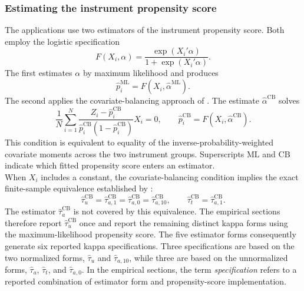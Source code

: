 \documentclass[12pt, a4paper, oneside]{article}
\theoremstyle{plain}
\theoremstyle{definition}
\begin{document}
\subsubsection{Estimating the instrument propensity score}

The applications use two estimators of the instrument propensity score. Both
employ the logistic specification
\[
    F(X_i,\alpha)
    =
    \frac{\exp(X_i'\alpha)}
         {1+\exp(X_i'\alpha)}.
\]
The first estimates $\alpha$ by maximum likelihood and produces
\[
    \hat p_i^{\mathrm{ML}}
    =
    F(X_i,\hat\alpha^{\mathrm{ML}}).
\]
The second applies the covariate-balancing approach of
\citet{imai2014covariate}. The estimate $\hat\alpha^{\mathrm{CB}}$ solves
\begin{equation}
    \frac{1}{N}\sum_{i=1}^N
    \frac{Z_i-\hat p_i^{\mathrm{CB}}}
         {\hat p_i^{\mathrm{CB}}(1-\hat p_i^{\mathrm{CB}})}
    X_i
    =0,
    \qquad
    \hat p_i^{\mathrm{CB}}
    =
    F(X_i,\hat\alpha^{\mathrm{CB}}).
    \label{eq:cbps_moment}
\end{equation}
This condition is equivalent to equality of the inverse-probability-weighted
covariate moments across the two instrument groups. Superscripts
$\mathrm{ML}$ and $\mathrm{CB}$ indicate which fitted propensity score enters
an estimator.\\
When $X_i$ includes a constant, the covariate-balancing condition implies the
exact finite-sample equivalence established by
\citet[Proposition~3.5]{sloczynski2025abadie}:
\begin{equation}
    \hat\tau_u^{\mathrm{CB}}
    =
    \hat\tau_{a,1}^{\mathrm{CB}}
    =
    \hat\tau_{a,0}^{\mathrm{CB}}
    =
    \hat\tau_{a,10}^{\mathrm{CB}},
    \qquad
    \hat\tau_t^{\mathrm{CB}}
    =
    \hat\tau_{a,1}^{\mathrm{CB}}.
    \label{eq:cbps_estimator_equivalence}
\end{equation}
The estimator $\hat\tau_a^{\mathrm{CB}}$ is not covered by this equivalence.
The empirical sections therefore report $\hat\tau_u^{\mathrm{CB}}$ once and
report the remaining distinct kappa forms using the maximum-likelihood
propensity score. The five estimator forms consequently generate six reported
kappa specifications. Three specifications are based on the two normalized
forms, $\hat\tau_u$ and $\hat\tau_{a,10}$, while three are based on the
unnormalized forms, $\hat\tau_a$, $\hat\tau_t$, and $\hat\tau_{a,0}$. In the
empirical sections, the term \emph{specification} refers to a reported
combination of estimator form and propensity-score implementation. 
\end{document}
